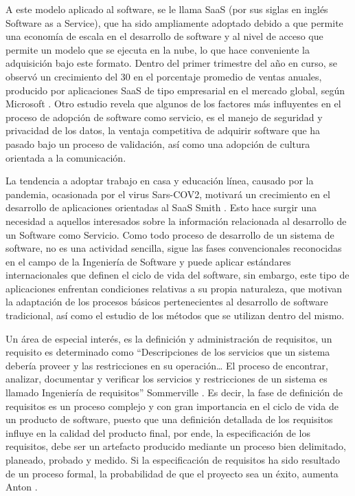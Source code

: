 \documentclass{article}
\begin{document}
A este modelo aplicado al software, se le llama SaaS (por sus siglas en inglés Software as a Service), que ha sido ampliamente adoptado debido a que permite una economía de escala en el desarrollo de software y al nivel 
de acceso que permite un modelo que se ejecuta en la nube, lo que hace conveniente la adquisición bajo este formato. Dentro del primer trimestre del año en curso, se observó un crecimiento del 30%
en el porcentaje promedio de ventas anuales, producido por aplicaciones SaaS de tipo empresarial en el mercado global, según Microsoft \cite{antecedentes7}. Otro estudio revela que algunos de los factores más influyentes en el 
proceso de adopción de software como servicio, es el manejo de seguridad y privacidad de los datos, la ventaja competitiva de adquirir software que ha pasado bajo un proceso de validación, así como una adopción de cultura orientada a la comunicación.

La tendencia a adoptar trabajo en casa y educación línea, causado por la pandemia, ocasionada por el virus Sars-COV2, motivará un crecimiento en el desarrollo de aplicaciones orientadas al SaaS Smith \cite{antecedentes5}. Esto hace 
surgir una necesidad a aquellos interesados sobre la información relacionada al desarrollo de un Software como Servicio.
Como todo proceso de desarrollo de un sistema de software, no es una actividad sencilla, sigue las fases convencionales reconocidas en el campo de la Ingeniería de Software y puede aplicar estándares internacionales 
que definen el ciclo de vida del software, sin embargo, este tipo de aplicaciones enfrentan condiciones relativas a su propia naturaleza, que motivan la adaptación de los procesos básicos pertenecientes al desarrollo de software 
tradicional, así como el estudio de los métodos que se utilizan dentro del mismo.

Un área de especial interés, es la definición y administración de requisitos, un requisito es determinado como “Descripciones de los servicios que un sistema debería proveer y las restricciones en su operación… El proceso de encontrar, analizar, 
documentar y verificar los servicios y restricciones de un sistema es llamado Ingeniería de requisitos” Sommerville \cite{antecedentes8}. Es decir, la fase de definición de requisitos es un proceso complejo y con gran importancia en el ciclo 
de vida de un producto de software, puesto que una definición detallada de los requisitos influye en la calidad del producto final, por ende, la especificación de los requisitos, debe ser un artefacto producido mediante un 
proceso bien delimitado, planeado, probado y medido. Si la especificación de requisitos ha sido resultado de un proceso formal, la probabilidad de que el proyecto sea un éxito, aumenta Anton \cite{antecedentes2}.
\end{document}
